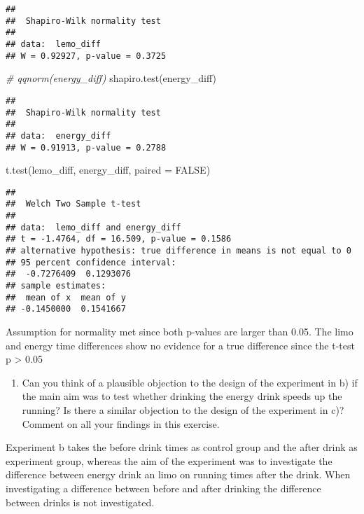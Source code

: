 \documentclass[
]{article}
\newenvironment{Shaded}{\begin{snugshade}}{\end{snugshade}}
\newcommand{\AttributeTok}[1]{\textcolor[rgb]{0.77,0.63,0.00}{#1}}
\newcommand{\CommentTok}[1]{\textcolor[rgb]{0.56,0.35,0.01}{\textit{#1}}}
\newcommand{\ConstantTok}[1]{\textcolor[rgb]{0.00,0.00,0.00}{#1}}
\newcommand{\FunctionTok}[1]{\textcolor[rgb]{0.00,0.00,0.00}{#1}}
\newcommand{\NormalTok}[1]{#1}
\providecommand{\tightlist}{%
  \setlength{\itemsep}{0pt}\setlength{\parskip}{0pt}}
\begin{document}
\begin{verbatim}
## 
##  Shapiro-Wilk normality test
## 
## data:  lemo_diff
## W = 0.92927, p-value = 0.3725
\end{verbatim}

\begin{Shaded}
\begin{Highlighting}[]
\CommentTok{\# qqnorm(energy\_diff)}
\FunctionTok{shapiro.test}\NormalTok{(energy\_diff)}
\end{Highlighting}
\end{Shaded}

\begin{verbatim}
## 
##  Shapiro-Wilk normality test
## 
## data:  energy_diff
## W = 0.91913, p-value = 0.2788
\end{verbatim}

\begin{Shaded}
\begin{Highlighting}[]
\FunctionTok{t.test}\NormalTok{(lemo\_diff, energy\_diff, }\AttributeTok{paired =} \ConstantTok{FALSE}\NormalTok{)}
\end{Highlighting}
\end{Shaded}

\begin{verbatim}
## 
##  Welch Two Sample t-test
## 
## data:  lemo_diff and energy_diff
## t = -1.4764, df = 16.509, p-value = 0.1586
## alternative hypothesis: true difference in means is not equal to 0
## 95 percent confidence interval:
##  -0.7276409  0.1293076
## sample estimates:
##  mean of x  mean of y 
## -0.1450000  0.1541667
\end{verbatim}

Assumption for normality met since both p-values are larger than 0.05.
The limo and energy time differences show no evidence for a true
difference since the t-test p \textgreater{} 0.05

\begin{enumerate}
\def\labelenumi{\alph{enumi})}
\setcounter{enumi}{3}
\tightlist
\item
  Can you think of a plausible objection to the design of the experiment
  in b) if the main aim was to test whether drinking the energy drink
  speeds up the running? Is there a similar objection to the design of
  the experiment in c)? Comment on all your findings in this exercise.
\end{enumerate}

Experiment b takes the before drink times as control group and the after
drink as experiment group, whereas the aim of the experiment was to
investigate the difference between energy drink an limo on running times
after the drink. When investigating a difference between before and
after drinking the difference between drinks is not investigated.
\end{document}
